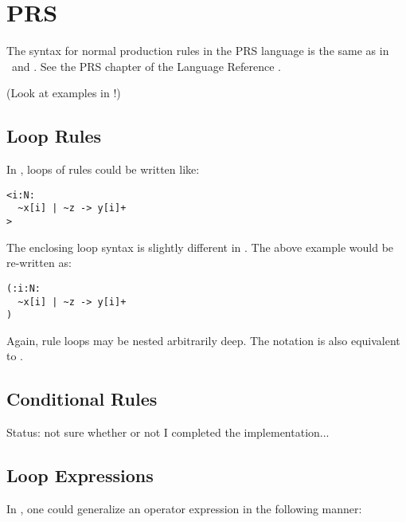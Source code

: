 
\section{PRS}
\label{sec:prs}

The syntax for normal production rules in the PRS language 
is the same as in \CAST\ and \hac.
See the PRS chapter of the Language Reference .

(Look at examples in !)

\subsection{Loop Rules}
\label{sec:prs:looprules}

In \CAST, loops of rules could be written like:

\begin{verbatim}
<i:N:
  ~x[i] | ~z -> y[i]+
>
\end{verbatim}

The enclosing loop syntax is slightly different in \hac.
The above example would be re-written as:

\begin{verbatim}
(:i:N:
  ~x[i] | ~z -> y[i]+
)
\end{verbatim}

Again, rule loops may be nested arbitrarily deep.  
The notation  is also equivalent to .  

\subsection{Conditional Rules}
\label{sec:prs:conditional}

Status: not sure whether or not I completed the implementation...

\subsection{Loop Expressions}
\label{sec:prs:loopexpr}

In \CAST, one could generalize an operator expression 
in the following manner:

